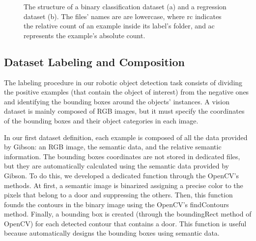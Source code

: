 \begin{figure}
	\centering
	\begin{subfigure}[b]{0.5\textwidth}
		\caption{}
		\label{fig:structureclassification}
	\end{subfigure}
	\begin{subfigure}[b]{0.4\textwidth}
		\caption{}
		\label{fig:structureregression}
	\end{subfigure}
	\caption{The structure of a binary classification dataset (a) and a regression dataset (b). The files' names are are lowercase, where \textsf{rc} indicates the relative count of an example inside its label's folder, and \textsf{ac} represents the example's absolute count. }
	\label{fig:structuredataset}
\end{figure}


\subsection{Dataset Labeling and Composition}

The labeling procedure in our robotic object detection task consists of dividing the positive examples (that contain the object of interest) from the negative ones and identifying the bounding boxes around the objects' instances. A vision dataset is mainly composed of RGB images, but it must specify the coordinates of the bounding boxes and their object categories in each image.

In our first dataset definition, each example is composed of all the data provided by Gibson: an RGB image, the semantic data, and the relative semantic information. The bounding boxes coordinates are not stored in dedicated files, but they are automatically calculated using  the semantic data provided by Gibson. To do this, we developed a dedicated function through the OpenCV's methods. At first, a semantic image is binarized assigning a precise color to the pixels that belong to a door and suppressing the others. Then, this function founds the contours in the binary image using the OpenCV's \textsf{findContours} method. Finally, a bounding box is created (through the \textsf{boundingRect} method of OpenCV) for each detected contour that contains a door. This function is useful because automatically designs the bounding boxes using semantic data.

